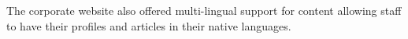 \documentclass[11pt,a4paper,sans]{moderncv}        %
\begin{document}
    The corporate website also offered multi-lingual support for content allowing staff to have their profiles and articles in their native languages.









\end{document}
